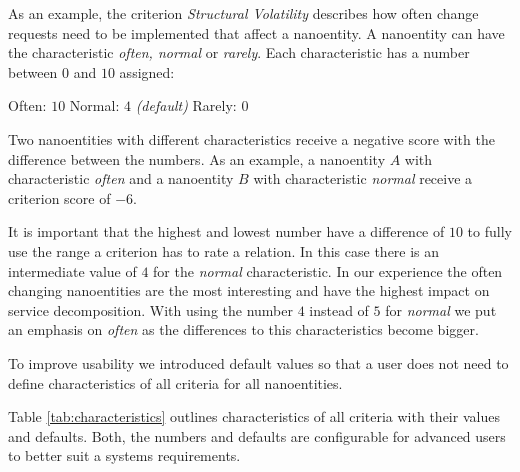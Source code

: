 As an example, the criterion \textit{Structural Volatility} describes how often change requests need to be implemented that affect a nanoentity. A nanoentity can have the characteristic \textit{often, normal} or \textit{rarely}. Each characteristic has a number between $0$ and $10$ assigned:

Often: $10$ \newline
Normal: $4$ \textit{(default)} \newline
Rarely: $0$ \newline

Two nanoentities with different characteristics receive a negative score with the difference between the numbers. As an example, a nanoentity $A$ with characteristic \textit{often} and a nanoentity $B$ with characteristic \textit{normal} receive a criterion score of $-6$. 

It is important that the highest and lowest number have a difference of $10$ to fully use the range a criterion has to rate a relation. \newline In this case there is an intermediate value of $4$ for the \textit{normal} characteristic. In our experience the often changing nanoentities are the most interesting and have the highest impact on service decomposition. With using the number $4$ instead of $5$ for \textit{normal} we put an emphasis on \textit{often} as the differences to this characteristics become bigger. 

To improve usability we introduced default values so that a user does not need to define characteristics of all criteria for all nanoentities. 

Table \ref{tab:characteristics} outlines characteristics of all criteria with their values and defaults. Both, the numbers and defaults are configurable for advanced users to better suit a systems requirements. 



